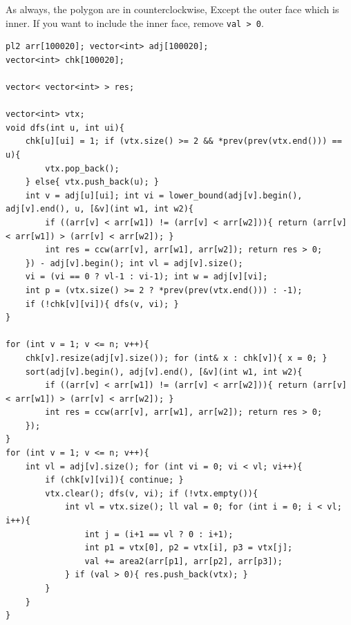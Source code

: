 As always, the polygon are in counterclockwise, Except the outer face which is inner.
If you want to include the inner face, remove \texttt{val > 0}.
\begin{verbatim}
pl2 arr[100020]; vector<int> adj[100020];
vector<int> chk[100020];

vector< vector<int> > res;

vector<int> vtx;
void dfs(int u, int ui){
	chk[u][ui] = 1; if (vtx.size() >= 2 && *prev(prev(vtx.end())) == u){
		vtx.pop_back();
	} else{ vtx.push_back(u); }
	int v = adj[u][ui]; int vi = lower_bound(adj[v].begin(), adj[v].end(), u, [&v](int w1, int w2){
		if ((arr[v] < arr[w1]) != (arr[v] < arr[w2])){ return (arr[v] < arr[w1]) > (arr[v] < arr[w2]); }
		int res = ccw(arr[v], arr[w1], arr[w2]); return res > 0;
	}) - adj[v].begin(); int vl = adj[v].size();
	vi = (vi == 0 ? vl-1 : vi-1); int w = adj[v][vi];
	int p = (vtx.size() >= 2 ? *prev(prev(vtx.end())) : -1);
	if (!chk[v][vi]){ dfs(v, vi); }
}

for (int v = 1; v <= n; v++){
	chk[v].resize(adj[v].size()); for (int& x : chk[v]){ x = 0; }
	sort(adj[v].begin(), adj[v].end(), [&v](int w1, int w2){
		if ((arr[v] < arr[w1]) != (arr[v] < arr[w2])){ return (arr[v] < arr[w1]) > (arr[v] < arr[w2]); }
		int res = ccw(arr[v], arr[w1], arr[w2]); return res > 0;
	});
}
for (int v = 1; v <= n; v++){
	int vl = adj[v].size(); for (int vi = 0; vi < vl; vi++){
		if (chk[v][vi]){ continue; }
		vtx.clear(); dfs(v, vi); if (!vtx.empty()){
			int vl = vtx.size(); ll val = 0; for (int i = 0; i < vl; i++){
				int j = (i+1 == vl ? 0 : i+1);
				int p1 = vtx[0], p2 = vtx[i], p3 = vtx[j];
				val += area2(arr[p1], arr[p2], arr[p3]);
			} if (val > 0){ res.push_back(vtx); }
		}
	}
}
\end{verbatim}